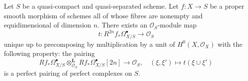 %

\begin{proposition}
\label{proposition-relative-poincare-duality}
Let $S$ be a quasi-compact and quasi-separated scheme. Let $f : X \to S$
be a proper smooth morphism of schemes all of whose fibres are nonempty
and equidimensional of dimension $n$. There exists an
$\mathcal{O}_S$-module map
$$
t : R^{2n}f_*\Omega^\bullet_{X/S} \longrightarrow \mathcal{O}_S
$$
unique up to precomposing by multiplication by a unit of
$H^0(X, \mathcal{O}_X)$ with the following property: the pairing
$$
Rf_*\Omega^\bullet_{X/S}
\otimes_{\mathcal{O}_S}^\mathbf{L}
Rf_*\Omega^\bullet_{X/S}[2n]
\longrightarrow
\mathcal{O}_S, \quad
(\xi, \xi') \longmapsto t(\xi \cup \xi')
$$
is a perfect pairing of perfect complexes on $S$.
\end{proposition}

